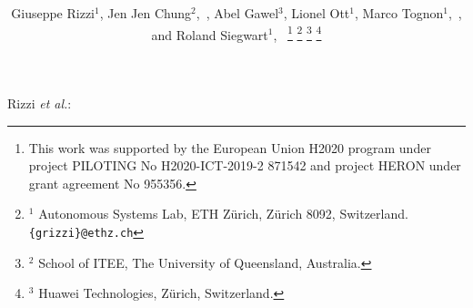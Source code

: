 \documentclass[journal]{IEEEtran}  %
\begin{document}
\title{
}


\author{Giuseppe Rizzi$^1$, Jen Jen Chung$^2$,~, Abel Gawel$^3$, Lionel Ott$^1$, Marco Tognon$^1$,~, and Roland Siegwart$^1$,~%
\thanks{This work was supported by the European Union H2020 program under project PILOTING No H2020-ICT-2019-2 871542 and project HERON under grant agreement No 955356.}
\thanks{$^1$ Autonomous Systems Lab, ETH Z\"urich, Z\"urich 8092, Switzerland. {\tt\small\{grizzi\}@ethz.ch}}%
\thanks{$^2$ School of ITEE, The University of Queensland, Australia.}%
\thanks{$^3$ Huawei Technologies, Z\"urich, Switzerland.}%
}

%                              
{Rizzi \MakeLowercase{\textit{et al.}}:  }




\maketitle
\end{document}
